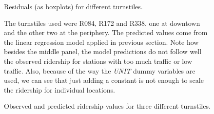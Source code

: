 \documentclass[a4paper,12pt,english]{sphinxmanual}
\begin{document}
\begin{figure}[htbp]
\centering
\capstart

\caption{Residuals (as boxplots) for different turnstiles.}\label{section2:figure38}\end{figure}
\begin{figure}[htbp]
\centering
\capstart

\caption{Observed and predicted ridership values for three different turnstiles.}{\small 
The turnstiles used were R084, R172 and R338, one at downtown and the other two
at the periphery. The predicted values come from the linear regression model applied
in previous section. Note how besides the middle panel, the model predictions do
not follow well the observed ridership for stations with too much traffic or low
traffic. Also, because of the way the \emph{UNIT} dummy variables are used, we can see
that just adding a constant is not enough to scale the ridership for individual
locations.
}\label{section2:figure39}\end{figure}
\end{document}
